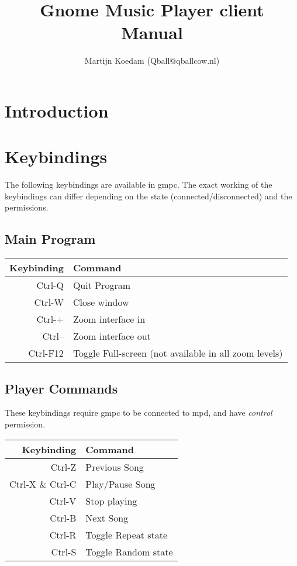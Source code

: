\documentclass{article}
\begin{document}
\title{Gnome Music Player client\\Manual}
\author{Martijn Koedam (Qball@qballcow.nl)}
\maketitle

\section{Introduction}
\section{Keybindings}
The following keybindings are available in gmpc. The exact working of the keybindings can differ depending on the state (connected/disconnected) and the permissions.
\subsection{Main Program}
\begin{tabular}{r|l}
Keybinding&Command\\
\hline
Ctrl-Q&Quit Program\\
Ctrl-W&Close window\\
Ctrl-+&Zoom interface in\\
Ctrl--&Zoom interface out\\
Ctrl-F12&Toggle Full-screen (not available in all zoom levels)\\
\end{tabular}

\subsection{Player Commands}
These keybindings require gmpc to be connected to mpd, and have \textit{control} permission.\\

\begin{tabular}{r|l}
Keybinding&Command\\
\hline
Ctrl-Z&Previous Song\\
Ctrl-X \& Ctrl-C&Play/Pause Song\\
Ctrl-V&Stop playing\\
Ctrl-B&Next Song\\
Ctrl-R&Toggle Repeat state\\
Ctrl-S&Toggle Random state\\
\end{tabular}
\end{document}
